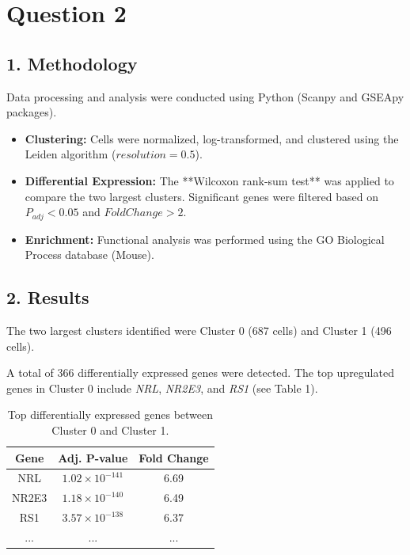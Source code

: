 \section*{Question 2}

\subsection*{1. Methodology}
Data processing and analysis were conducted using Python (Scanpy and GSEApy packages).
\begin{itemize}
    \item \textbf{Clustering:} Cells were normalized, log-transformed, and clustered using the Leiden algorithm ($resolution=0.5$).
    \item \textbf{Differential Expression:} The **Wilcoxon rank-sum test** was applied to compare the two largest clusters. Significant genes were filtered based on $P_{adj} < 0.05$ and $FoldChange > 2$.
    \item \textbf{Enrichment:} Functional analysis was performed using the GO Biological Process database (Mouse).
\end{itemize}

\subsection*{2. Results}
The two largest clusters identified were Cluster 0 (687 cells) and Cluster 1 (496 cells).

A total of 366 differentially expressed genes were detected. The top upregulated genes in Cluster 0 include \textit{NRL}, \textit{NR2E3}, and \textit{RS1} (see Table 1).

\begin{table}[h!]
    \centering
    \begin{tabular}{|c|c|c|}
        \hline
        \textbf{Gene} & \textbf{Adj. P-value}   & \textbf{Fold Change} \\
        \hline
        NRL           & $1.02 \times 10^{-141}$ & 6.69                 \\
        NR2E3         & $1.18 \times 10^{-140}$ & 6.49                 \\
        RS1           & $3.57 \times 10^{-138}$ & 6.37                 \\
        ...           & ...                     & ...                  \\
        \hline
    \end{tabular}
    \caption{Top differentially expressed genes between Cluster 0 and Cluster 1.}
\end{table}

